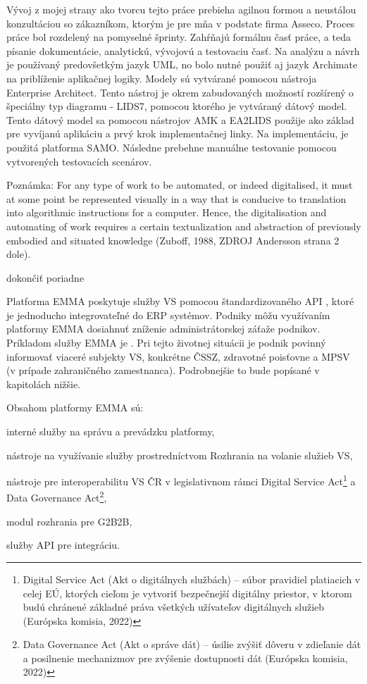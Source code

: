 Vývoj z mojej strany ako tvorcu tejto práce prebieha agilnou formou a neustálou konzultáciou so zákazníkom, ktorým je pre mňa v podstate firma Asseco. Proces práce bol rozdelený na pomyselné šprinty. Zahŕňajú formálnu časť práce, a teda písanie dokumentácie, analytickú, vývojovú a testovaciu časť. Na analýzu a návrh je používaný predovšetkým jazyk UML, no bolo nutné použiť aj jazyk Archimate na priblíženie aplikačnej logiky. Modely sú vytvárané pomocou nástroja Enterprise Architect. Tento nástroj je okrem zabudovaných možností rozšírený o špeciálny typ diagramu - LIDS7, pomocou ktorého je vytváraný dátový model. Tento dátový model sa pomocou nástrojov AMK a EA2LIDS použije ako základ pre vyvíjanú aplikáciu a prvý krok implementačnej linky. Na implementáciu, je použitá platforma SAMO. Následne prebehne manuálne testovanie pomocou vytvorených testovacích scenárov.

\TODO
Poznámka: 
For any type of work to be automated, or indeed digitalised, it must
at some point be represented visually in a way that is conducive to
translation into algorithmic instructions for a computer. Hence, the
digitalisation and automating of work requires a certain textualization
and abstraction of previously embodied and situated knowledge (Zuboff, 1988, ZDROJ Andersson strana 2 dole).

\TODO dokončiť poriadne

Platforma EMMA poskytuje služby VS pomocou štandardizovaného API
, ktoré je jednoducho integrovateľné do ERP systémov. Podniky môžu využívaním platformy EMMA dosiahnuť zníženie administrátorskej záťaže podnikov. Príkladom služby EMMA je . Pri tejto životnej situácii je podnik povinný informovať viaceré subjekty VS, konkrétne ČSSZ, zdravotné poisťovne a MPSV (v prípade zahraničného zamestnanca). Podrobnejšie to bude popísané v kapitolách nižšie.

Obsahom platformy EMMA sú:

\startitemize
\item{interné služby na správu a prevádzku platformy,}
\item{nástroje na využívanie služby prostredníctvom Rozhrania na volanie služieb VS,}
\item{nástroje pre interoperabilitu VS ČR v legislativnom rámci Digital Service Act\footnote{Digital Service Act (Akt o digitálnych službách) -- súbor pravidiel platiacich v celej EÚ, ktorých cieľom je vytvoriť bezpečnejší digitálny priestor, v ktorom budú chránené základné práva všetkých užívateľov digitálnych služieb \scr(Európska komisia, 2022)} a Data Governance Act\footnote{Data Governance Act (Akt o správe dát) -- úsilie zvýšiť dôveru v zdieľanie dát a posilnenie mechanizmov pre zvýšenie dostupnosti dát \scr(Európska komisia, 2022)},}
\item{modul rozhrania pre G2B2B,}
\item{služby API pre integráciu.}
\stopitemize 

